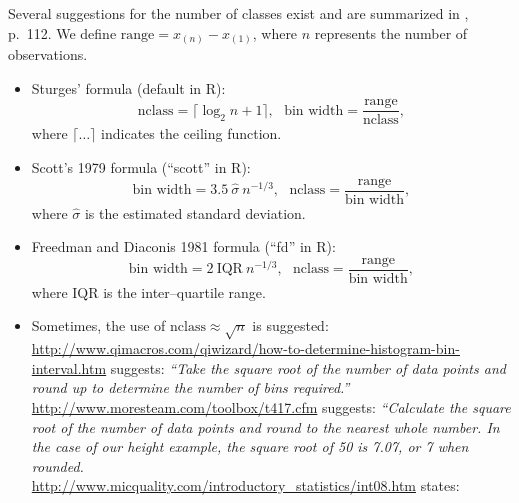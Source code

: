 Several suggestions for the number of classes exist and are 
summarized in \cite{VR2002}, p.~112. We define $\mbox{range} = x_{(n)} - x_{(1)}$, 
where $n$ represents the number of observations.
\begin{itemize}
\item Sturges' formula (default in R): 
\[
\mbox{nclass} = \lceil \log_2 n + 1 \rceil, ~~~ \mbox{bin width} = \frac{\mbox{range}}{\mbox{nclass}},
\]
where $\lceil \ldots \rceil$ indicates the ceiling function.

\item Scott's 1979 formula (``scott'' in R):
\[
\mbox{bin width} = 3.5 ~ \hat{\sigma} ~ n^{-1/3}, ~~~ \mbox{nclass} = \frac{\mbox{range}}{\mbox{bin width}},
\]
where $\hat{\sigma}$ is the estimated standard deviation.

\item Freedman and Diaconis 1981 formula (``fd'' in R): 
\[
\mbox{bin width} = 2 ~ \mbox{IQR} ~ n^{-1/3}, ~~~ \mbox{nclass} = \frac{\mbox{range}}{\mbox{bin width}},
\]
where $\mbox{IQR}$ is the inter--quartile range.

\item Sometimes, the use of $\mbox{nclass} \approx \sqrt{n}$ is suggested: \\[0.2cm]
%
\url{http://www.qimacros.com/qiwizard/how-to-determine-histogram-bin-interval.htm}
suggests: {\it ``Take the square root of the number of data points and round up to 
determine the number of bins required.''} \\[0.2cm]
%
\url{http://www.moresteam.com/toolbox/t417.cfm} suggests:
{\it ``Calculate the square root of the number of data points and round to the 
nearest whole number. In the case of our height example, 
the square root of 50 is 7.07, or 7 when rounded.} \\[0.2cm]
%
\url{http://www.micquality.com/introductory_statistics/int08.htm} states: 

\end{itemize}



